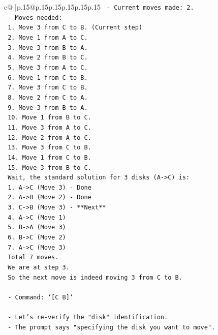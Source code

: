 \documentclass{article}
\begin{document}
{\begin{supertabular}{c@{$\;$}|p{.15\linewidth}@{}p{.15\linewidth}p{.15\linewidth}p{.15\linewidth}p{.15\linewidth}p{.15\linewidth}}
{{{\texttt{  {-} Current moves made: 2.} \\
\texttt{  {-} Moves needed:} \\
\texttt{    1. Move 3 from C to B. (Current step)} \\
\texttt{    2. Move 1 from A to C.} \\
\texttt{    3. Move 3 from B to A.} \\
\texttt{    4. Move 2 from B to C.} \\
\texttt{    5. Move 3 from A to C.} \\
\texttt{    6. Move 1 from C to B.} \\
\texttt{    7. Move 3 from C to B.} \\
\texttt{    8. Move 2 from C to A.} \\
\texttt{    9. Move 3 from B to A.} \\
\texttt{    10. Move 1 from B to C.} \\
\texttt{    11. Move 3 from A to C.} \\
\texttt{    12. Move 2 from A to C.} \\
\texttt{    13. Move 3 from C to B.} \\
\texttt{    14. Move 1 from C to B.} \\
\texttt{    15. Move 3 from B to C.} \\
\texttt{    Wait, the standard solution for 3 disks (A{-}>C) is:} \\
\texttt{    1. A{-}>C (Move 3) {-} Done} \\
\texttt{    2. A{-}>B (Move 2) {-} Done} \\
\texttt{    3. C{-}>B (Move 3) {-} **Next**} \\
\texttt{    4. A{-}>C (Move 1)} \\
\texttt{    5. B{-}>A (Move 3)} \\
\texttt{    6. B{-}>C (Move 2)} \\
\texttt{    7. A{-}>C (Move 3)} \\
\texttt{    Total 7 moves.} \\
\texttt{    We are at step 3.} \\
\texttt{    So the next move is indeed moving 3 from C to B.} \\
\\ 
\texttt{  {-} Command: `{[}C B{]}`} \\
\\ 
\texttt{  {-} Let's re{-}verify the "disk" identification.} \\
\texttt{  {-} The prompt says "specifying the disk you want to move".} \\
}}}
\end{supertabular}}
\end{document}
